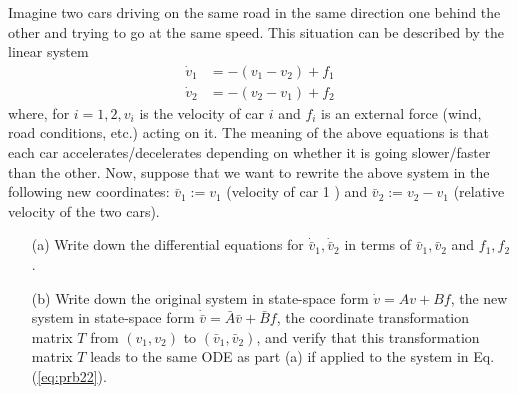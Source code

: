 \documentclass[12pt]{article}
\begin{document}
Imagine two cars driving on the same road in the same direction one behind the other and trying to go at the same speed. This situation can be described by the linear system
\begin{equation}\label{eq:prb22}
    \begin{split}
 \dot{v}_1 &=-\left(v_1-v_2\right)+f_1  \\
 \dot{v}_2 &=-\left(v_2-v_1\right)+f_2
\end{split}
\end{equation}
where, for $i=1,2, v_i$ is the velocity of car $i$ and $f_i$ is an external force (wind, road conditions, etc.) acting on it. The meaning of the above equations is that each car accelerates/decelerates depending on whether it is going slower/faster than the other. Now, suppose that we want to rewrite the above system in the following new coordinates: $\bar{v}_1:=v_1$ (velocity of car 1 ) and $\bar{v}_2:=v_2-v_1$ (relative velocity of the two cars).
\begin{itemize}
    \item [(a)] Write down the differential equations for $\dot{\bar{v}}_1, \dot{\bar{v}}_2$ in terms of $\bar{v}_1, \bar{v}_2$ and $f_1, f_2$.
    \item [(b)]  Write down the original system in state-space form $\dot{v}=A v+B f$, the new system in state-space form $\dot{\bar{v}}=\bar{A} \bar{v}+\bar{B} f$, the coordinate transformation matrix $T$ from $\left(v_1, v_2\right)$ to $\left(\bar{v}_1, \bar{v}_2\right)$, and verify that this transformation matrix $T$ leads to the same ODE as part (a) if applied to the system in Eq. (\ref{eq:prb22}).
\end{itemize}
\end{document}
